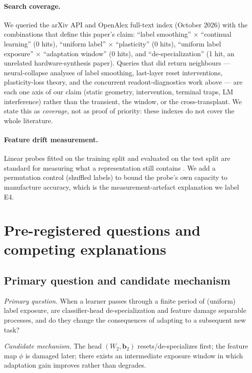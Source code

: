 \documentclass[review,12pt]{elsarticle}
\newcommand{\head}{W_2}
\newcommand{\feat}{\phi}
\begin{document}
\paragraph{Search coverage.}
We queried the arXiv API and OpenAlex full-text index (October 2026) with the
combinations that define this paper's claim: ``label smoothing'' $\times$
``continual learning'' (0 hits), ``uniform label'' $\times$ ``plasticity''
(0 hits), ``uniform label exposure'' $\times$ ``adaptation window''
(0 hits), and ``de-specialization'' (1 hit, an unrelated hardware-synthesis
paper). Queries that did return neighbours --- neural-collapse analyses of
label smoothing, last-layer reset interventions, plasticity-loss theory, and
the concurrent readout-diagnostics work above --- are each one axis of our
claim (static geometry, intervention, terminal traps, LM interference) rather
than the transient, the window, or the cross-transplant. We state this as
\emph{coverage}, not as proof of priority: these indexes do not cover the
whole literature.

\paragraph{Feature drift measurement.}
Linear probes fitted on the training split and evaluated on the test split are
standard for measuring what a representation still contains
\cite{alain2017understanding}. We add a permutation control (shuffled labels)
to bound the probe's own capacity to manufacture accuracy, which is the
measurement-artefact explanation we label E4.

\section{Pre-registered questions and competing explanations}
\label{sec:questions}

\subsection{Primary question and candidate mechanism}
\emph{Primary question.} When a learner passes through a finite period of
(uniform) label exposure, are classifier-head de-specialization and feature
damage separable processes, and do they change the consequences of adapting to
a subsequent new task?

\emph{Candidate mechanism.} The head $(\head,\bm b_2)$ resets/de-specializes
first; the feature map $\feat$ is damaged later; there exists an intermediate
exposure window in which adaptation gain improves rather than degrades.
\end{document}
